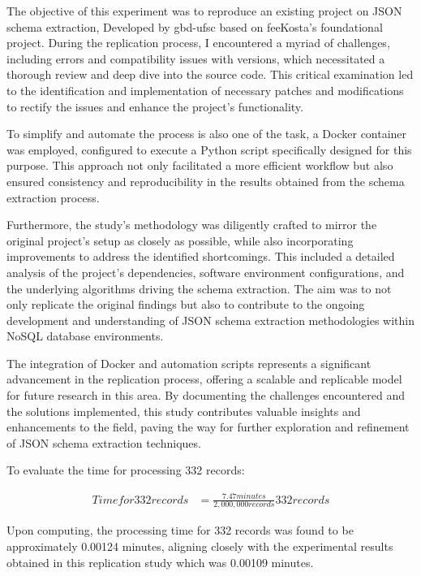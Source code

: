 \documentclass[sigconf, nonacm]{acmart}
\begin{document}
The objective of this experiment was to reproduce an existing project on JSON schema extraction, Developed by gbd-ufsc based on feeKosta’s foundational project. During the replication process, I encountered a myriad of challenges, including errors and compatibility issues with versions, which necessitated a thorough review and deep dive into the source code. This critical examination led to the identification and implementation of necessary patches and modifications to rectify the issues and enhance the project's functionality.

To simplify and automate the process is also one of the task, a Docker container was employed, configured to execute a Python script specifically designed for this purpose. This approach not only facilitated a more efficient workflow but also ensured consistency and reproducibility in the results obtained from the schema extraction process.

Furthermore, the study's methodology was diligently crafted to mirror the original project's setup as closely as possible, while also incorporating improvements to address the identified shortcomings. This included a detailed analysis of the project's dependencies, software environment configurations, and the underlying algorithms driving the schema extraction. The aim was to not only replicate the original findings but also to contribute to the ongoing development and understanding of JSON schema extraction methodologies within NoSQL database environments.

The integration of Docker and automation scripts represents a significant advancement in the replication process, offering a scalable and replicable model for future research in this area. By documenting the challenges encountered and the solutions implemented, this study contributes valuable insights and enhancements to the field, paving the way for further exploration and refinement of JSON schema extraction techniques.

To evaluate the time for processing 332 records:

	\begin{equation} \label{eq1}
	\begin{split}
	Time for 332 records & = \frac{7.47 minutes}{2,000,000 records} 332 records
	\end{split}
	\end{equation}

Upon computing, the processing time for 332 records was found to be approximately 0.00124 minutes, aligning closely with the experimental results obtained in this replication study which was 0.00109 minutes.
\end{document}
